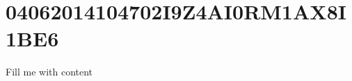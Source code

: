 \documentclass{article}
\begin{document}
\section{04062014104702I9Z4AI0RM1AX8I1BE6}
Fill me with content
\end{document}
